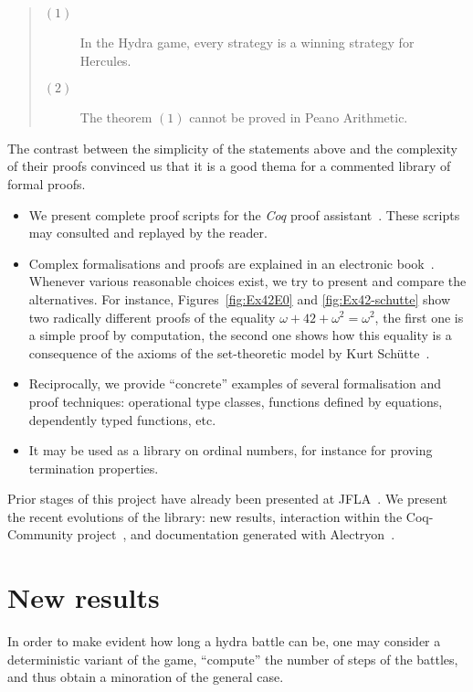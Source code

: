 \documentclass{easychair}
\begin{document}
\begin{quote}
\begin{description}
\item[$(1)$] In the Hydra game, every strategy is a winning strategy for Hercules.
  \item[$(2)$] The theorem $(1)$ cannot be proved in Peano Arithmetic.
\end{description}
\end{quote}

The contrast between the simplicity of the statements above and the complexity of their proofs convinced us that it is a good thema for a commented library of formal proofs.


\begin{itemize}
\item We present complete proof scripts for the \textit{Coq} proof assistant~\cite{Coq}. These scripts may consulted and replayed by the reader.
\item Complex formalisations and proofs are explained in an
  electronic book~\cite{HydraBook}. Whenever various reasonable choices exist, we try to present and compare the alternatives.
  For instance, Figures~\vref{fig:Ex42E0} and \vref{fig:Ex42-schutte} show two radically different proofs of the equality
  $\omega+42+\omega^2=\omega^2$, the first one is a simple proof by computation, the second one shows how this equality
  is a consequence of the axioms of the set-theoretic model  by Kurt Schütte~\cite{schutte}. 
\item
  Reciprocally, we provide ``concrete'' examples of several formalisation and proof techniques: operational type classes, functions defined by  equations, dependently typed functions, etc.
\item It may be used as a library on ordinal numbers, for instance for proving termination properties.
  \end{itemize}

 Prior stages of this project have already been presented at
 JFLA~\cite{PCiota, JFLA2018paper}.
We present the recent evolutions of the library: new results, interaction within the Coq-Community project~\cite{CoqCommunity}, and documentation generated with Alectryon~\cite{alectryonpaper, alectryongithub}.

\section{New results}
In order to make evident how long a hydra battle can be,
one may consider a deterministic variant of the game,
``compute'' the number of steps of the battles, and thus obtain a minoration of the general case.
\end{document}

